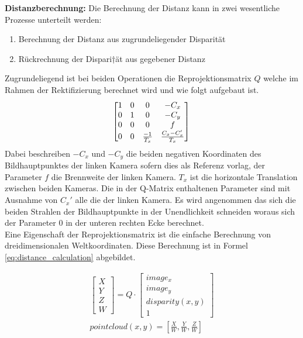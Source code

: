 \noindent
\textbf{Distanzberechnung:}
Die Berechnung der Distanz kann in zwei wesentliche Prozesse unterteilt werden:
\begin{enumerate}
  \item Berechnung der Distanz aus zugrundeliegender Disparität
  \item Rückrechnung der Dispari†ät aus gegebener Distanz
\end{enumerate}
Zugrundeliegend ist bei beiden Operationen die Reprojektionsmatrix $Q$ welche im Rahmen der Rektifizierung berechnet wird und wie folgt aufgebaut ist.
\begin{equation}
    \begin{bmatrix}
      1 & 0 & 0 & -C_x\\
      0 & 1 & 0 & -C_y\\
      0 & 0 & 0 & f\\
      0 & 0 & \frac{-1}{T_x} & \frac{C_x - C_x'}{T_x}
    \end{bmatrix}\\\\
\end{equation}
Dabei beschreiben $-C_x$ und $-C_y$ die beiden negativen Koordinaten des Bildhauptpunktes der linken Kamera sofern dies als Referenz vorlag, der Parameter $f$ die Brennweite der linken Kamera. $T_x$ ist die horizontale Translation zwischen beiden Kameras. Die in der Q-Matrix enthaltenen Parameter sind mit Ausnahme von $C_x'$ alle die der linken Kamera. Es wird angenommen das sich die beiden Strahlen der Bildhauptpunkte in der Unendlichkeit schneiden woraus sich der Parameter $0$ in der unteren rechten Ecke berechnet.\\

\noindent
Eine Eigenschaft der Reprojektionsmatrix ist die einfache Berechnung von dreidimensionalen Weltkoordinaten. Diese Berechnung ist in Formel \ref{eq:distance_calculation} abgebildet.

\begin{equation}\label{eq:distance_calculation}
    \begin{aligned}
        \begin{bmatrix}
            X\\ Y \\ Z\\ W
        \end{bmatrix}
        = Q \cdot 
        \begin{bmatrix}
            image_x\\ image_y \\ disparity(x,y)\\ 1
        \end{bmatrix}\\
        pointcloud(x,y) = [\frac{X}{W}, \frac{Y}{W}, \frac{Z}{W} ]
    \end{aligned}
\end{equation}

